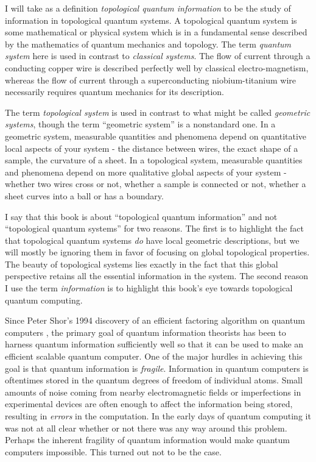 \documentclass{article}
\theoremstyle{definition}
\numberwithin{figure}{section}
\begin{document}
I will take as a definition \textit{topological quantum information} to be the study of information in topological quantum systems. A topological quantum system is some mathematical or physical system which is in a fundamental sense described by the mathematics of quantum mechanics and topology. The term \textit{quantum system} here is used in contrast to \textit{classical systems}. The flow of current through a conducting copper wire is described perfectly well by classical electro-magnetism, whereas the flow of current through a superconducting niobium-titanium wire necessarily requires quantum mechanics for its description.

The term \textit{topological system} is used in contrast to what might be called \textit{geometric systems}, though the term “geometric system” is a nonstandard one. In a geometric system, measurable quantities and phenomena depend on quantitative local aspects of your system - the distance between wires, the exact shape of a sample, the curvature of a sheet. In a topological system, measurable quantities and phenomena depend on more qualitative global aspects of your system - whether two wires cross or not, whether a sample is connected or not, whether a sheet curves into a ball or has a boundary.

I say that this book is about “topological quantum information” and not “topological quantum systems” for two reasons. The first is to highlight the fact that topological quantum systems \textit{do} have local geometric descriptions, but we will mostly be ignoring them in favor of focusing on global topological properties. The beauty of topological systems lies exactly in the fact that this global perspective retains all the essential information in the system. The second reason I use the term \textit{information} is to highlight this book’s eye towards topological quantum computing. 

Since Peter Shor’s 1994 discovery of an efficient factoring algorithm on quantum computers \cite{shor1994algorithms}, the primary goal of quantum information theorists has been to harness quantum information sufficiently well so that it can be used to make an efficient scalable quantum computer. One of the major hurdles in achieving this goal is that quantum information is \textit{fragile}. Information in quantum computers is oftentimes stored in the quantum degrees of freedom of individual atoms. Small amounts of noise coming from nearby electromagnetic fields or imperfections in experimental devices are often enough to affect the information being stored, resulting in \textit{errors} in the computation. In the early days of quantum computing it was not at all clear whether or not there was any way around this problem. Perhaps the inherent fragility of quantum information would make quantum computers impossible. This turned out not to be the case.
\end{document}
